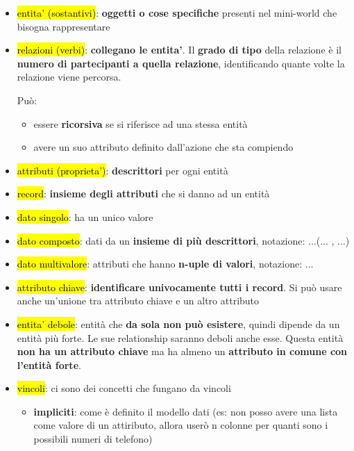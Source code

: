 \begin{itemize}
	\item \hl{entita' (sostantivi)}: \textbf{oggetti o cose specifiche} presenti nel mini-world che bisogna rappresentare

	\item \hl{relazioni (verbi)}: \textbf{collegano le entita'}. Il \textbf{grado di tipo} della relazione è il \textbf{numero di partecipanti a quella relazione}, identificando quante volte la relazione viene percorsa.
		
		Può:
		\begin{itemize}
			\item essere \textbf{ricorsiva} se si riferisce ad una stessa entità
			\item avere un suo attributo definito dall'azione che sta compiendo
		
		\end{itemize}
		
		

	
	\item \hl{attributi (proprieta')}: \textbf{descrittori} per ogni entità
	
	\item \hl{record}: \textbf{insieme degli attributi} che si danno ad un entità
	
	\item \hl{dato singolo}: ha un unico valore
	
	\item \hl{dato composto}: dati da un \textbf{insieme di più descrittori}, notazione: ...(... , ...)
	
	\item \hl{dato multivalore}: attributi che hanno \textbf{n-uple di valori}, notazione: {...}
	
	\item \hl{attributo chiave}: \textbf{identificare univocamente tutti i record}. Si può usare anche un'unione tra attributo chiave e un altro attributo
	
	\item \hl{entita' debole}: entità che \textbf{da sola non può esistere}, quindi dipende da un entità più forte. Le sue relationship saranno deboli anche esse. Questa entità \textbf{non ha un attributo chiave} ma ha almeno un \textbf{attributo in comune con l'entità forte}.
	
	\item \hl{vincoli}: ci sono dei concetti che fungano da vincoli
	
		\begin{itemize}
			\item \textbf{impliciti}: come è definito il modello dati (es: non posso avere una lista come valore di un attiributo, allora userò n colonne per quanti sono i possibili numeri di telefono)
			

\end{itemize}
\end{itemize}
